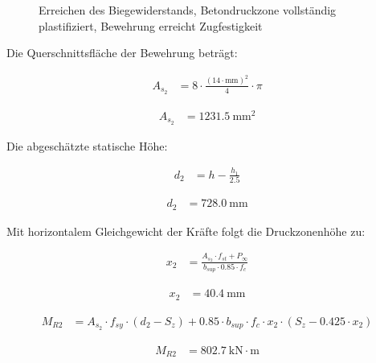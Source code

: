 \documentclass[
  11pt,
  letterpaper,
]{scrreprt}
\begin{document}
\begin{figure}[H]


\caption{\label{fig-t6_qs_MR_pos}Erreichen des Biegewiderstands,
Betondruckzone vollständig plastifiziert, Bewehrung erreicht
Zugfestigkeit}

\end{figure}%

Die Querschnittsfläche der Bewehrung beträgt:

$$
\begin{aligned}
A_{s_{2}} &= 8 \cdot \frac{ \left( 14 \cdot \mathrm{mm} \right) ^{ 2 } }{ 4 } \cdot \pi \; 
\end{aligned}
$$

$$
\begin{aligned}
A_{s_{2}} &= 1231.5\ \mathrm{mm}^{2} \;
\end{aligned}
$$

Die abgeschätzte statische Höhe:

$$
\begin{aligned}
d_{2} &= h - \frac{ h_{1} }{ 2.5 } \; 
\end{aligned}
$$

$$
\begin{aligned}
d_{2} &= 728.0\ \mathrm{mm} \;
\end{aligned}
$$

Mit horizontalem Gleichgewicht der Kräfte folgt die Druckzonenhöhe zu:

$$
\begin{aligned}
x_{2} &= \frac{ A_{s_{2}} \cdot f_{st} + P_{\infty} }{ b_{sup} \cdot 0.85 \cdot f_{c} } \; 
\end{aligned}
$$

$$
\begin{aligned}
x_{2} &= 40.4\ \mathrm{mm} \;
\end{aligned}
$$

$$
\begin{aligned}
M_{R2} &= A_{s_{2}} \cdot f_{sy} \cdot \left( d_{2} - S_{z} \right) + 0.85 \cdot b_{sup} \cdot f_{c} \cdot x_{2} \cdot \left( S_{z} - 0.425 \cdot x_{2} \right) \; 
\end{aligned}
$$

$$
\begin{aligned}
M_{R2} &= 802.7\ \mathrm{kN} \cdot \mathrm{m} \;
\end{aligned}
$$
\end{document}
